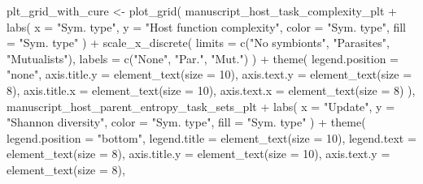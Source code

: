 \documentclass[
]{book}
\newenvironment{Shaded}{\begin{snugshade}}{\end{snugshade}}
\newcommand{\AttributeTok}[1]{\textcolor[rgb]{0.77,0.63,0.00}{#1}}
\newcommand{\DecValTok}[1]{\textcolor[rgb]{0.00,0.00,0.81}{#1}}
\newcommand{\FunctionTok}[1]{\textcolor[rgb]{0.00,0.00,0.00}{#1}}
\newcommand{\NormalTok}[1]{#1}
\newcommand{\OtherTok}[1]{\textcolor[rgb]{0.56,0.35,0.01}{#1}}
\newcommand{\SpecialCharTok}[1]{\textcolor[rgb]{0.00,0.00,0.00}{#1}}
\newcommand{\StringTok}[1]{\textcolor[rgb]{0.31,0.60,0.02}{#1}}
\begin{document}
\begin{Shaded}
\begin{Highlighting}[]
\NormalTok{plt\_grid\_with\_cure }\OtherTok{\textless{}{-}} \FunctionTok{plot\_grid}\NormalTok{(}
\NormalTok{  manuscript\_host\_task\_complexity\_plt }\SpecialCharTok{+}
    \FunctionTok{labs}\NormalTok{(}
      \AttributeTok{x =} \StringTok{"Sym. type"}\NormalTok{,}
      \AttributeTok{y =} \StringTok{"Host function complexity"}\NormalTok{,}
      \AttributeTok{color =} \StringTok{"Sym. type"}\NormalTok{,}
      \AttributeTok{fill =} \StringTok{"Sym. type"}
\NormalTok{    ) }\SpecialCharTok{+}
    \FunctionTok{scale\_x\_discrete}\NormalTok{(}
      \AttributeTok{limits =} \FunctionTok{c}\NormalTok{(}\StringTok{"No symbionts"}\NormalTok{, }\StringTok{"Parasites"}\NormalTok{, }\StringTok{"Mutualists"}\NormalTok{),}
      \AttributeTok{labels =} \FunctionTok{c}\NormalTok{(}\StringTok{"None"}\NormalTok{, }\StringTok{"Par."}\NormalTok{, }\StringTok{"Mut."}\NormalTok{)}
\NormalTok{    ) }\SpecialCharTok{+}
    \FunctionTok{theme}\NormalTok{(}
      \AttributeTok{legend.position =} \StringTok{"none"}\NormalTok{,}
      \AttributeTok{axis.title.y =} \FunctionTok{element\_text}\NormalTok{(}\AttributeTok{size =} \DecValTok{10}\NormalTok{),}
      \AttributeTok{axis.text.y =} \FunctionTok{element\_text}\NormalTok{(}\AttributeTok{size =} \DecValTok{8}\NormalTok{),}
      \AttributeTok{axis.title.x =} \FunctionTok{element\_text}\NormalTok{(}\AttributeTok{size =} \DecValTok{10}\NormalTok{),}
      \AttributeTok{axis.text.x =} \FunctionTok{element\_text}\NormalTok{(}\AttributeTok{size =} \DecValTok{8}\NormalTok{)}
\NormalTok{    ),}
\NormalTok{  manuscript\_host\_parent\_entropy\_task\_sets\_plt }\SpecialCharTok{+}
    \FunctionTok{labs}\NormalTok{(}
      \AttributeTok{x =} \StringTok{"Update"}\NormalTok{,}
      \AttributeTok{y =} \StringTok{"Shannon diversity"}\NormalTok{,}
      \AttributeTok{color =} \StringTok{"Sym. type"}\NormalTok{,}
      \AttributeTok{fill =} \StringTok{"Sym. type"}
\NormalTok{    ) }\SpecialCharTok{+}
    \FunctionTok{theme}\NormalTok{(}
      \AttributeTok{legend.position =} \StringTok{"bottom"}\NormalTok{,}
      \AttributeTok{legend.title =} \FunctionTok{element\_text}\NormalTok{(}\AttributeTok{size =} \DecValTok{10}\NormalTok{),}
      \AttributeTok{legend.text =} \FunctionTok{element\_text}\NormalTok{(}\AttributeTok{size =} \DecValTok{8}\NormalTok{),}
      \AttributeTok{axis.title.y =} \FunctionTok{element\_text}\NormalTok{(}\AttributeTok{size =} \DecValTok{10}\NormalTok{),}
      \AttributeTok{axis.text.y =} \FunctionTok{element\_text}\NormalTok{(}\AttributeTok{size =} \DecValTok{8}\NormalTok{),}

\end{Highlighting}
\end{Shaded}
\end{document}
